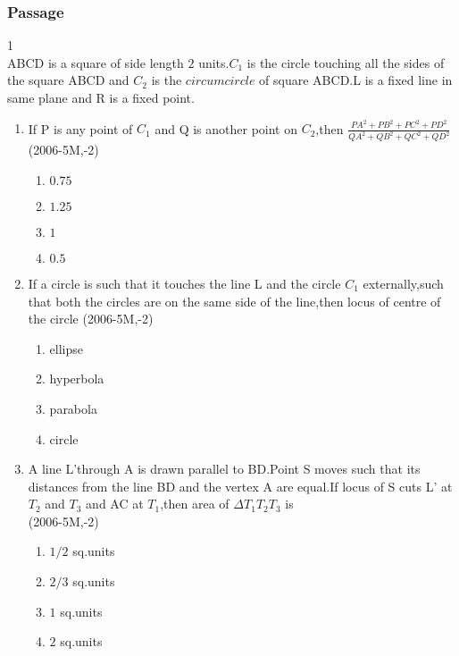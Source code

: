 \documentclass[journal,12pt,twocolumn]{IEEEtran}
\theoremstyle{remark}
\begin{document}
\subsubsection{Passage }
1\\
ABCD is a square of side length $2$ units.$C_1$ is the circle touching all the sides of the square ABCD and $C_2$ is the $circumcircle$ of square ABCD.L is a fixed line in same plane and R is a fixed point.\\
\begin{enumerate}
\item If P is any point of $C_1$ and Q is another point on $C_2$,then $\frac{PA^2+PB^2+PC^2+PD^2}{QA^2+QB^2+QC^2+QD^2}$\\
\hfill (2006-5M,-2)\\
\begin{enumerate}
\item $0.75$\\
\item $1.25$\\
\item $1$\\
\item $0.5$\\
\end{enumerate}
\item If a circle is such that it touches the line L and the circle $C_1$ externally,such that both the circles are on the same side of the line,then locus of centre of the circle 
\hfill(2006-5M,-2)
\begin{enumerate}
\item ellipse\\
\item hyperbola\\
\item parabola\\
\item circle\\
\end{enumerate}
\item A line L'through A is drawn parallel to BD.Point S moves such that its distances from the line BD and the vertex A are equal.If locus of S cuts L' at $T_2$ and $T_3$ and AC at $T_1$,then area of $\Delta T_1T_2T_3$ is\\
\hfill(2006-5M,-2)\\
\begin{enumerate}
\item $1/2$ sq.units\\
\item $2/3$ sq.units\\
\item $1$ sq.units\\
\item $2$ sq.units\\
\end{enumerate}
\end{enumerate}
\end{document}
